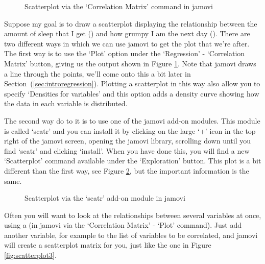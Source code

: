 \begin{figure}[!htb]
\begin{center}
\caption{Scatterplot via the `Correlation Matrix' command in jamovi}
\label{fig:scatterplot1}
\HR
\end{center}
\end{figure}

Suppose my goal is to draw a scatterplot displaying the relationship between the amount of sleep that I get () and how grumpy I am the next day (). There are two different ways in which we can use jamovi to get the plot that we're after. The first way is to use the `Plot' option under the `Regression' - `Correlation Matrix' button, giving us the output shown in Figure \ref{fig:scatterplot1}. Note that jamovi draws a line through the points, we'll come onto this a bit later in Section~(\ref{sec:introregression}). Plotting a scatterplot in this way also allow you to specify `Densities for variables' and this option adds a density curve showing how the data in each variable is distributed. 

The second way do to it is to use one of the jamovi add-on modules. This module is called `scatr' and you can install it by clicking on the large `+' icon in the top right of the jamovi screen, opening the jamovi library, scrolling down until you find `scatr' and clicking `install'. When you have done this, you will find a new `Scatterplot' command available under the `Exploration' button. This plot is a bit different than the first way, see Figure \ref{fig:scatterplot2}, but the important information is the same.

\begin{figure}[!htb]
\begin{center}
\caption{Scatterplot via the `scatr' add-on module in jamovi}
\label{fig:scatterplot2}
\HR
\end{center}
\end{figure}


Often you will want to look at the relationships between several variables at once, using a  (in jamovi via the `Correlation Matrix' - `Plot' command). Just add another variable, for example  to the list of variables to be correlated, and jamovi will create a scatterplot matrix for you, just like the one in Figure \ref{fig:scatterplot3}.

